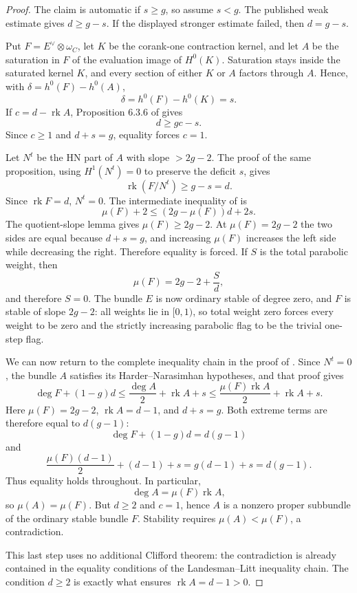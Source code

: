 \documentclass[11pt]{article}
\theoremstyle{definition}
\newcommand{\rk}{\operatorname{rk}}
\begin{document}
\begin{proof}
The claim is automatic if $s\ge g$, so assume $s<g$.  The published weak
estimate gives $d\ge g-s$.  If the displayed stronger estimate failed, then
$d=g-s$.

Put $F=E^\vee\otimes\omega_C$, let $K$ be the corank-one contraction
kernel, and let $A$ be the saturation in $F$ of the evaluation image of
$H^0(K)$.  Saturation stays inside the saturated kernel $K$, and every
section of either $K$ or $A$ factors through $A$.  Hence, with
$\delta=h^0(F)-h^0(A)$,
\[
 \delta=h^0(F)-h^0(K)=s.
\]
If $c=d-\rk A$, Proposition 6.3.6 of \cite{LLGeo} gives
\[
 d\ge gc-s.
\]
Since $c\ge1$ and $d+s=g$, equality forces $c=1$.

Let $N^t$ be the HN part of $A$ with slope $>2g-2$.  The proof of the same
proposition, using $H^1(N^t)=0$ to preserve the deficit $s$, gives
\[
 \rk(F/N^t)\ge g-s=d.
\]
Since $\rk F=d$, $N^t=0$.  The intermediate inequality of
\cite[Lemma 6.2.3]{LLGeo} is
\[
 \mu(F)+2\le (2g-\mu(F))d+2s.
\]
The quotient-slope lemma gives $\mu(F)\ge2g-2$.  At $\mu(F)=2g-2$ the two
sides are equal because $d+s=g$, and increasing $\mu(F)$ increases the left
side while decreasing the right.  Therefore equality is forced.  If $S$ is
the total parabolic weight, then
\[
 \mu(F)=2g-2+\frac{S}{d},
\]
and therefore $S=0$.  The bundle $E$ is now ordinary stable of degree zero,
and $F$ is stable of slope $2g-2$: all weights lie in $[0,1)$, so total
weight zero forces every weight to be zero and the strictly increasing
parabolic flag to be the trivial one-step flag.

We can now return to the complete inequality chain in the proof of
\cite[Lemma 6.2.3]{LLGeo}.  Since $N^t=0$, the bundle $A$ satisfies its
Harder--Narasimhan hypotheses, and that proof gives
\[
 \deg F+(1-g)d
 \le \frac{\deg A}{2}+\rk A+s
 \le \frac{\mu(F)\rk A}{2}+\rk A+s.
\]
Here $\mu(F)=2g-2$, $\rk A=d-1$, and $d+s=g$.  Both extreme terms are
therefore equal to $d(g-1)$:
\[
 \deg F+(1-g)d=d(g-1)
\]
and
\[
 \frac{\mu(F)(d-1)}2+(d-1)+s
 =g(d-1)+s=d(g-1).
\]
Thus equality holds throughout.  In particular,
\[
 \deg A=\mu(F)\rk A,
\]
so $\mu(A)=\mu(F)$.  But $d\ge2$ and $c=1$, hence $A$ is a nonzero proper
subbundle of the ordinary stable bundle $F$.  Stability requires
$\mu(A)<\mu(F)$, a contradiction.

This last step uses no additional Clifford theorem: the contradiction is
already contained in the equality conditions of the Landesman--Litt
inequality chain.  The condition $d\ge2$ is exactly what ensures
$\rk A=d-1>0$.
\end{proof}
\end{document}
